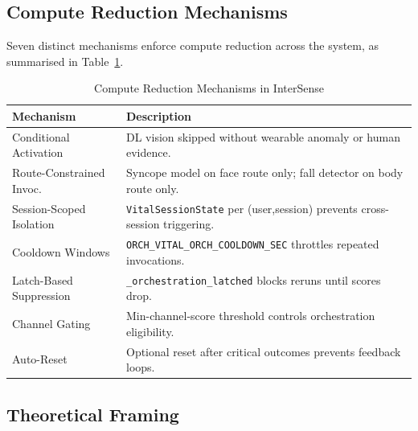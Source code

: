 \documentclass[10pt,twocolumn,a4paper]{article}
\begin{document}
\subsection{Compute Reduction Mechanisms}

Seven distinct mechanisms enforce compute reduction across the system,
as summarised in Table~\ref{tab:compute}.

\begin{table}[t]
  \centering
  \caption{Compute Reduction Mechanisms in InterSense}
  \label{tab:compute}
  \renewcommand{\arraystretch}{1.18}
  \small
  \begin{tabularx}{\columnwidth}{@{} l >{\raggedright\arraybackslash}X @{}}
    \toprule
    \textbf{Mechanism}         & \textbf{Description} \\
    \midrule
    Conditional Activation     & DL vision skipped without wearable anomaly
                                 or human evidence. \\
    Route-Constrained Invoc.   & Syncope model on face route only; fall
                                 detector on body route only. \\
    Session-Scoped Isolation   & \texttt{VitalSessionState} per (user,session)
                                 prevents cross-session triggering. \\
    Cooldown Windows           & \texttt{ORCH\_VITAL\_ORCH\_COOLDOWN\_SEC}
                                 throttles repeated invocations. \\
    Latch-Based Suppression    & \texttt{\_orchestration\_latched} blocks
                                 reruns until scores drop. \\
    Channel Gating             & Min-channel-score threshold controls
                                 orchestration eligibility. \\
    Auto-Reset                 & Optional reset after critical outcomes
                                 prevents feedback loops. \\
    \bottomrule
  \end{tabularx}
\end{table}

\subsection{Theoretical Framing}
\end{document}
